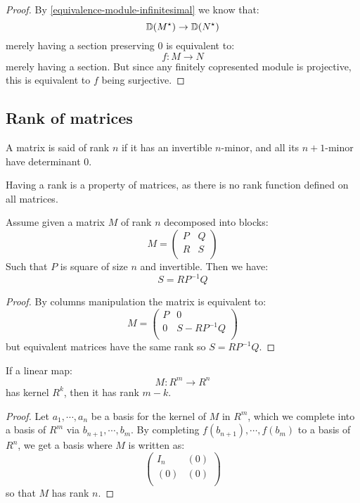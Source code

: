 \begin{proof}
By \cref{equivalence-module-infinitesimal} we know that:
\[\mathbb{D}(M^\star) \to \mathbb{D}(N^\star)\]
merely having a section preserving $0$ is equivalent to:
\[f:M\to N\]
merely having a section. But since any finitely copresented module is projective, this is equivalent to $f$ being surjective.
\end{proof}


\subsection{Rank of matrices}

\begin{definition}
A matrix is said of rank $n$ if it has an invertible $n$-minor, and all its $n+1$-minor have determinant $0$.
\end{definition}

Having a rank is a property of matrices, as there is no rank function defined on all matrices.

\begin{lemma}\label{rank-bloc-matrix}
Assume given a matrix $M$ of rank $n$ decomposed into blocks:
\[M = \begin{pmatrix}
P & Q  \\
R & S \\
\end{pmatrix}\]
Such that $P$ is square of size $n$ and invertible. Then we have:
\[S = RP^{-1}Q\]
\end{lemma}

\begin{proof}
By columns manipulation the matrix is equivalent to:
\[M = \begin{pmatrix}
P & 0  \\
0 & S - RP^{-1}Q \\
\end{pmatrix}\]
but equivalent matrices have the same rank so $S=RP^{-1}Q$.
\end{proof}

\begin{lemma}
If a linear map:
\[M:R^m \to R^n\]
has kernel $R^k$, then it has rank $m-k$.
\end{lemma}

\begin{proof}
Let $a_1,\cdots,a_n$ be a basis for the kernel of $M$ in $R^m$, which we complete into a basis of $R^m$ via $b_{n+1},\cdots,b_m$. By completing $f(b_{n+1}),\cdots, f(b_m)$ to a basis of $R^n$, we get a basis where $M$ is written as:
\[\begin{pmatrix}
I_n & (0)  \\
(0) & (0) \\
\end{pmatrix}\]
so that $M$ has rank $n$.
\end{proof}

